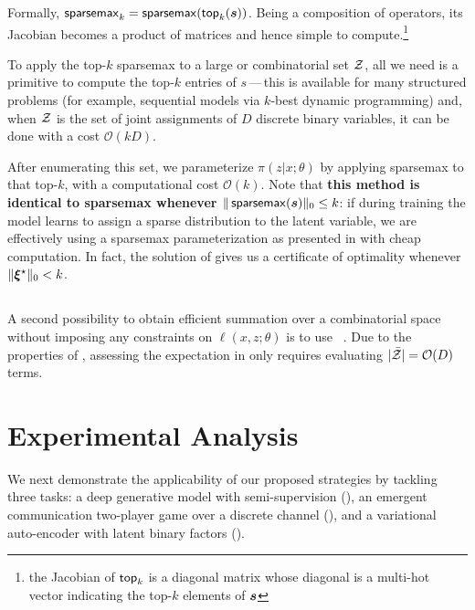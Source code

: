 Formally, $\operatorname{\mathsf{sparsemax}_\text{$k$}} = \operatorname*{\mathsf{sparsemax}}(\operatorname{\mathsf{top}_\text{$k$}}(\bm{s}))$. Being a composition
of operators, its Jacobian becomes a product of matrices and hence
simple to compute.\footnote{the Jacobian of $\operatorname{\mathsf{top}_\text{$k$}}$ is a diagonal matrix whose
    diagonal is a multi-hot vector indicating the top-$k$ elements of
    $\bm{s}$}

To apply the top-$k$ sparsemax to a large or combinatorial set $\mathcal{Z}$,
all we need is a primitive to compute the top-$k$ entries of
$s$\,---\,this is available for many structured problems (for example,
sequential models via $k$-best dynamic programming) and, when $\mathcal{Z}$
is the set of joint assignments of $D$ discrete binary variables, it
can be done with a cost $\mathcal{O}(kD)$.

After enumerating this set, we parameterize $\pi(z|x;\theta)$ by
applying sparsemax to that top-$k$, with a
computational cost $\mathcal{O}(k)$. Note that {\bf this method is
        identical to sparsemax whenever $\|\operatorname*{\mathsf{sparsemax}}(\bm{s})\|_0 \le k$}: if
during training the model learns to assign a sparse distribution to
the latent variable, we are effectively using a sparsemax
parameterization as presented in  with cheap
computation. In fact, the solution of 
gives us a certificate of optimality whenever $\|\bm{\xi}^\star\|_0 < k$.

\subsection{\label{sec:smap}\smap}

\noindent A second possibility to obtain efficient summation over a
combinatorial space without imposing any constraints on $\ell(x, z;
    \theta)$ is to use \smap~\citep[;][]{sparsemap, sparsemapcg}.
Due to the properties of \smap,
assessing the expectation in  only requires evaluating
$|\bar{\mathcal{Z}}| = \mathcal{O}(D)$ terms.

\section{\label{sec:applications}Experimental Analysis}

\noindent We next demonstrate the applicability of our proposed strategies by
tackling three tasks: a deep generative model with semi-supervision
(), an emergent communication two-player game over a
discrete channel (), and a variational auto-encoder with
latent binary factors ().

